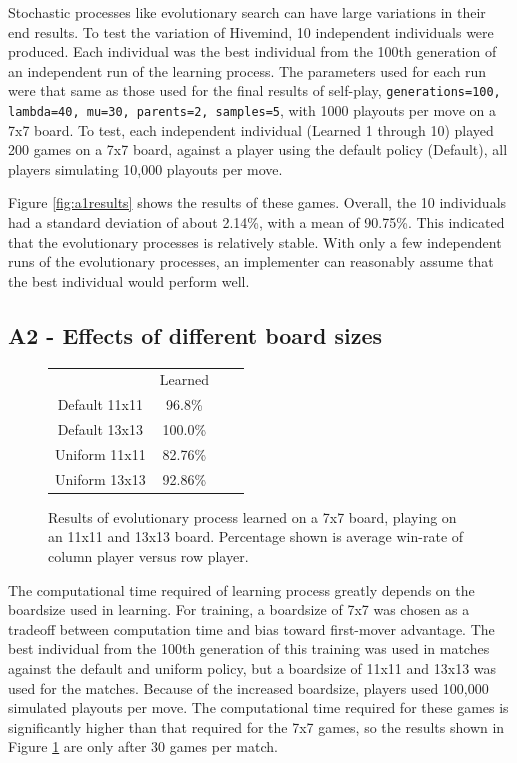 \documentclass[11pt]{report}
\begin{document}
Stochastic processes like evolutionary search can have large variations in their end results. To test the variation of Hivemind, 10 independent individuals were produced. Each individual was the best individual from the 100th generation of an independent run of the learning process. The parameters used for each run were that same as those used for the final results of self-play,  \texttt{generations=100, lambda=40, mu=30, parents=2, samples=5}, with 1000 playouts per move on a 7x7 board. To test, each independent individual (Learned 1 through 10) played 200 games on a 7x7 board, against a player using the default policy (Default), all players simulating 10,000 playouts per move.

Figure \ref{fig:a1results} shows the results of these games. Overall, the 10 individuals had a standard deviation of about 2.14\%, with a mean of 90.75\%. This indicated that the evolutionary processes is relatively stable. With only a few independent runs of the evolutionary processes, an implementer can reasonably assume that the best individual would perform well.

\subsection{A2 - Effects of different board sizes}
\begin{figure}[t]
	\begin{center}
		\begin{tabular}{c c c c}
		& Learned \\
		Default 11x11 & 96.8\% \\
		Default 13x13 & 100.0\% \\
		Uniform 11x11 & 82.76\% \\
		Uniform 13x13 & 92.86\% \\
		\hline
		\end{tabular}
		\caption{Results of evolutionary process learned on a 7x7 board, playing on an 11x11 and 13x13 board. Percentage shown is average win-rate of column player versus row player.}
		\label{fig:a2results}
	\end{center}
\end{figure}

The computational time required of learning process greatly depends on the boardsize used in learning. For training, a boardsize of 7x7 was chosen as a tradeoff between computation time and bias toward first-mover advantage. The best individual from the 100th generation of this training was used in matches against the default and uniform policy, but a boardsize of 11x11 and 13x13 was used for the matches. Because of the increased boardsize, players used 100,000 simulated playouts per move. The computational time required for these games is significantly higher than that required for the 7x7 games, so the results shown in Figure \ref{fig:a2results} are only after 30 games per match.
\end{document}
